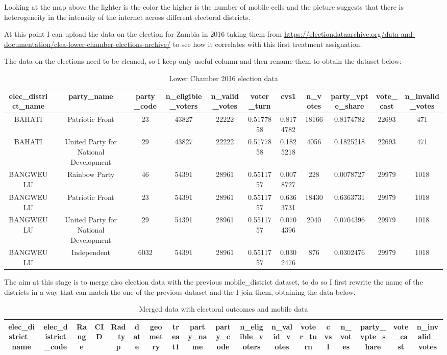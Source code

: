 \documentclass[
]{article}
\begin{document}
Looking at the map above the lighter is the color the higher is the
number of mobile cells and the picture suggests that there is
heterogeneity in the intensity of the internet across different
electoral districts.

At this point I can upload the data on the election for Zambia in 2016
taking them from
\url{https://electiondataarchive.org/data-and-documentation/clea-lower-chamber-elections-archive/}
to see how it correlates with this first treatment assignation.

The data on the elections need to be cleaned, so I keep only useful
column and then rename them to obtain the dataset below:

\begin{longtable}[t]{ccccccccccc}
\caption{\label{tab:clean}\resizebox{\textwidth}{!} {Lower Chamber 2016 election data}}\\
\toprule
elec\_district\_name & party\_name & party\_code & n\_eligible\_voters & n\_valid\_votes & voter\_turn & cvs1 & n\_votes & party\_vpte\_share & vote\_cast & n\_invalid\_votes\\
\midrule
BAHATI & Patriotic Front & 23 & 43827 & 22222 & 0.5177858 & 0.8174782 & 18166 & 0.8174782 & 22693 & 471\\
BAHATI & United Party for National Development & 29 & 43827 & 22222 & 0.5177858 & 0.1825218 & 4056 & 0.1825218 & 22693 & 471\\
BANGWEULU & Rainbow Party & 46 & 54391 & 28961 & 0.5511757 & 0.0078727 & 228 & 0.0078727 & 29979 & 1018\\
BANGWEULU & Patriotic Front & 23 & 54391 & 28961 & 0.5511757 & 0.6363731 & 18430 & 0.6363731 & 29979 & 1018\\
BANGWEULU & United Party for National Development & 29 & 54391 & 28961 & 0.5511757 & 0.0704396 & 2040 & 0.0704396 & 29979 & 1018\\
\addlinespace
BANGWEULU & Independent & 6032 & 54391 & 28961 & 0.5511757 & 0.0302476 & 876 & 0.0302476 & 29979 & 1018\\
\bottomrule
\end{longtable}

The aim at this stage is to merge also election data with the previous
mobile\_district dataset, to do so I first rewrite the name of the
districts in a way that can match the one of the previous dataset and
the I join them, obtaining the data below.

\begin{longtable}[t]{cccccccccccccccccc}
\caption{\label{tab:join}\resizebox{\textwidth}{!} {Merged data with electoral outcomes and mobile data}}\\
\toprule
elec\_district\_name & elec\_district\_code & Range & CID & Rad\_typ & date & geometry & treat1 & party\_name & party\_code & n\_eligible\_voters & n\_valid\_votes & voter\_turn & cvs1 & n\_votes & party\_vpte\_share & vote\_cast & n\_invalid\_votes\\


\bottomrule
\end{longtable}
\end{document}
